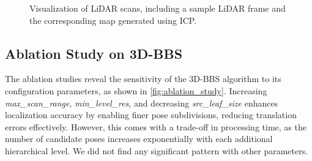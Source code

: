 \begin{figure}[t]
    \caption{Visualization of LiDAR scans, including a sample LiDAR frame and the corresponding map generated using ICP.}
    \label{fig:lidar_scans}
\end{figure}

\subsection{Ablation Study on 3D-BBS}
The ablation studies reveal the sensitivity of the 3D-BBS algorithm to its configuration parameters, as shown in \ref{fig:ablation_study}. Increasing \textit{max\_scan\_range}, \textit{min\_level\_res}, and decreasing \textit{src\_leaf\_size} enhances localization accuracy by enabling finer pose subdivisions, reducing translation errors effectively. However, this comes with a trade-off in processing time, as the number of candidate poses increases exponentially with each additional hierarchical level. We did not find any significant pattern with other parameters.

